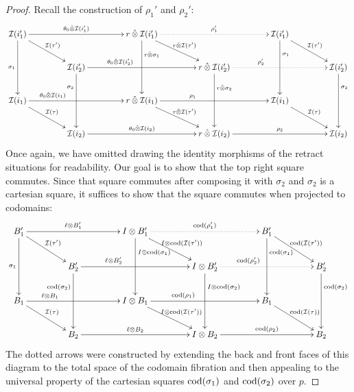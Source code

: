 \documentclass[reqno,10pt,a4paper,oneside]{amsart}
\begin{document}
\begin{proof}
Recall the construction of $\rho_1'$ and $\rho_2'$:
\[
\xymatrix@C+2em{
  \cal{I}(i_1')
  \ar[rr]^-{\thetal \hatotimes \cal{I}(i_1')}
  \ar[dd]_{\sigma_1}
  \ar[dr]^{\cal{I}(\tau')}
&&
  \intervalr \hatotimes \cal{I}(i_1')
  \ar@{.>}[rr]^-{\rho_1'}
  \ar[dd]^(0.3){\intervalr \hatotimes \sigma_1}
  \ar[dr]^{\intervalr \hatotimes \cal{I}(\tau')}
&&
  \cal{I}(i_1')
  \ar[dd]^(0.3){\sigma_1}
  \ar[dr]^{\cal{I}(\tau')}
\\&
  \cal{I}(i_2')
  \ar[rr]^-(0.3){\thetal \hatotimes \cal{I}(i_2')}
  \ar[dd]_(0.3){\sigma_2}
&&
  \intervalr \hatotimes \cal{I}(i_2')
  \ar@{.>}[rr]^-(0.3){\rho_2'}
  \ar[dd]^(0.3){\intervalr \hatotimes \sigma_2}
&&
  \cal{I}(i_2')
  \ar[dd]^(0.3){\sigma_2}
\\
  \cal{I}(i_1)
  \ar[rr]^-(0.25){\thetal \hatotimes \cal{I}(i_1)}
  \ar[dr]^{\cal{I}(\tau)}
&&
  \intervalr \hatotimes \cal{I}(i_1)
  \ar[rr]^-(0.3){\rho_1}
  \ar[dr]^{\intervalr \hatotimes \cal{I}(\tau')}
&&
  \cal{I}(i_1)
  \ar[dr]^{\cal{I}(\tau)}
\\&
  \cal{I}(i_2)
  \ar[rr]^-{\thetal \hatotimes \cal{I}(i_2)}
&&
  \intervalr \hatotimes \cal{I}(i_2)
  \ar[rr]^-{\rho_2}
&&
  \cal{I}(i_2)
}
\]
Once again, we have omitted drawing the identity morphisms of the retract situations for readability.
Our goal is to show that the top right square commutes.
Since that square commutes after composing it with $\sigma_2$ and $\sigma_2$ is a cartesian square, it suffices to show that the square commutes when projected to codomains:
\[
\xymatrix@C+2em{
  B_1'
  \ar[rr]^-{\intervall \otimes B_1'}
  \ar[dd]_{\sigma_1}
  \ar[dr]^{\cal{I}(\tau')}
&&
  \interval \otimes B_1'
  \ar@{.>}[rr]^-{\cod(\rho_1')}
  \ar[dd]^(0.3){\interval \otimes \cod(\sigma_1)}
  \ar[dr]^{\interval \otimes \cod(\cal{I}(\tau'))}
&&
  B_1'
  \ar[dd]^(0.3){\cod(\sigma_1)}
  \ar[dr]^{\cod(\cal{I}(\tau'))}
\\&
  B_2'
  \ar[rr]^-(0.3){\intervall \otimes B_2'}
  \ar[dd]_(0.3){\cod(\sigma_2)}
&&
  \interval \otimes B_2'
  \ar@{.>}[rr]^-(0.3){\cod(\rho_2')}
  \ar[dd]^(0.3){\interval \otimes \cod(\sigma_2)}
&&
  B_2'
  \ar[dd]^(0.3){\cod(\sigma_2)}
\\
  B_1
  \ar[rr]^-(0.25){\intervall \otimes B_1}
  \ar[dr]^{\cal{I}(\tau)}
&&
  \interval \otimes B_1
  \ar[rr]^-(0.3){\cod(\rho_1)}
  \ar[dr]^{\interval \otimes \cod(\cal{I}(\tau'))}
&&
  B_1
  \ar[dr]^{\cod(\cal{I}(\tau))}
\\&
  B_2
  \ar[rr]^-{\intervall \otimes B_2}
&&
  \interval \otimes B_2
  \ar[rr]^-{\cod(\rho_2)}
&&
  B_2
}
\]
The dotted arrows were constructed by extending the back and front faces of this diagram to the total space of the codomain fibration and then appealing to the universal property of the cartesian squares $\operatorname{cod}(\sigma_1)$ and $\operatorname{cod}(\sigma_2)$ over $p$.

\end{proof}
\end{document}
